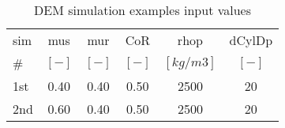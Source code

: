 \begin{table}[h]
\centering
\begin{tabular}{lccccc}
\hline
 sim &  \ac{mus} & \ac{mur} & \ac{CoR} & \ac{rhop} & \ac{dCylDp} \\
  \#  &	$[-]$  & $[-]$   & $[-]$   & $[kg/m3]$ & $[-]$ \\
          \hline
    1st & 0.40  & 0.40  & 0.50  & 2500  & 20 \\
    2nd & 0.60  & 0.40  & 0.50  & 2500  & 20 \\


\hline
\end{tabular}
\caption{DEM simulation examples input values}
\label{tab:11DEMSimExampleinputvalues}
\end{table}